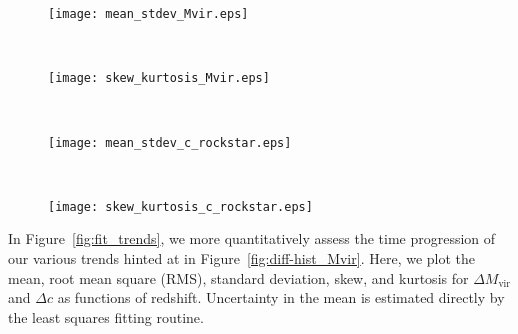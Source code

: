 \begin{figure*}[t]
	\centering
	\begin{subfigure}{}
		\texttt{[image: mean\_stdev\_Mvir.eps]}
	\end{subfigure}
	~
	\begin{subfigure}{}
		\texttt{[image: skew\_kurtosis\_Mvir.eps]}
	\end{subfigure}
	\\
	\begin{subfigure}{}
		\texttt{[image: mean\_stdev\_c\_rockstar.eps]}
	\end{subfigure}
	~
	\begin{subfigure}{}
		\texttt{[image: skew\_kurtosis\_c\_rockstar.eps]}
	\end{subfigure}
	\caption[Statistics as functions of redshift for generalized normal fits]{\footnotesize Mean, standard deviation, and RMS (\textit{left column}) and skew and excess kurtosis (\textit{right column}) as functions of redshift for $\Delta M_{\mathrm{vir}}$ (\textit{top row}) and $\Delta c$ (\textit{bottom row}).  In the left column, $\mu$ is plotted as blue points, and $\mu \pm \sigma$ is plotted as the black dashed line, and RMS values are plotted as a green dotted line.  The red dashed line is a linear fit to the mean.  We find a significant trend for $\mu$ for $\Delta M_{\mathrm{vir}}$ to be more positive at higher redshift and gradually shift toward zero as the simulation progresses.  The mean for $\Delta c$, however, remains at or very near zero for most of the simulation.  The $\Delta M_{\mathrm{vir}}$ and $\Delta c$ distributions narrow over time, with a slight decrease in $\sigma$.  In the right column, we plot skew (blue line) and excess kurtosis (red line).  Skew is positive for much of the simulation for $\Delta M_{\mathrm{vir}}$, but is much smaller for $\Delta c$.  Kurtosis is large (much more peaked than Gaussian) for both $\Delta M_{\mathrm{vir}}$ and $\Delta c$ throughout much of the simulation, and especially at later redshift.}
	\label{fig:fit_trends}
\end{figure*}

In Figure~\ref{fig:fit_trends}, we more quantitatively assess the time progression of our various trends hinted at in Figure~\ref{fig:diff-hist_Mvir}.  Here, we plot the mean, root mean square (RMS), standard deviation, skew, and kurtosis for $\Delta M_{\mathrm{vir}}$ and $\Delta c$ as functions of redshift.  Uncertainty in the mean is estimated directly by the least squares fitting routine.

